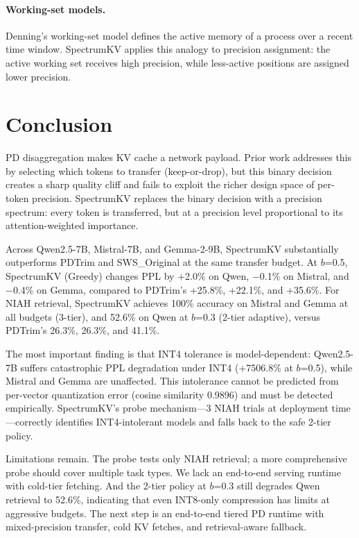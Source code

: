 \documentclass[11pt]{article}
\newcommand{\method}{SpectrumKV}
\newcommand{\fullmethod}{SpectrumKV}
\newcommand{\pct}{\%}
\theoremstyle{definition}
\theoremstyle{plain}
\begin{document}
\paragraph{Working-set models.}
Denning's working-set model \citep{denning1968working} defines the active memory of a process over a recent time window.  \method{} applies this analogy to precision assignment: the active working set receives high precision, while less-active positions are assigned lower precision.

\section{Conclusion}
\label{sec:conclusion}

PD disaggregation makes KV cache a network payload.  Prior work addresses this by selecting which tokens to transfer (keep-or-drop), but this binary decision creates a sharp quality cliff and fails to exploit the richer design space of per-token precision.  \fullmethod{} replaces the binary decision with a precision spectrum: every token is transferred, but at a precision level proportional to its attention-weighted importance.

Across Qwen2.5-7B, Mistral-7B, and Gemma-2-9B, \method{} substantially outperforms PDTrim and SWS\_Original at the same transfer budget.  At $b$=0.5, \method{} (Greedy) changes PPL by +2.0\pct{} on Qwen, $-$0.1\pct{} on Mistral, and $-$0.4\pct{} on Gemma, compared to PDTrim's +25.8\pct{}, +22.1\pct{}, and +35.6\pct{}.  For NIAH retrieval, \method{} achieves 100\pct{} accuracy on Mistral and Gemma at all budgets (3-tier), and 52.6\pct{} on Qwen at $b$=0.3 (2-tier adaptive), versus PDTrim's 26.3\pct{}, 26.3\pct{}, and 41.1\pct{}.

The most important finding is that INT4 tolerance is model-dependent: Qwen2.5-7B suffers catastrophic PPL degradation under INT4 (+7506.8\pct{} at $b$=0.5), while Mistral and Gemma are unaffected.  This intolerance cannot be predicted from per-vector quantization error (cosine similarity 0.9896) and must be detected empirically.  \method{}'s probe mechanism---3 NIAH trials at deployment time---correctly identifies INT4-intolerant models and falls back to the safe 2-tier policy.

Limitations remain.  The probe tests only NIAH retrieval; a more comprehensive probe should cover multiple task types.  We lack an end-to-end serving runtime with cold-tier fetching.  And the 2-tier policy at $b$=0.3 still degrades Qwen retrieval to 52.6\pct{}, indicating that even INT8-only compression has limits at aggressive budgets.  The next step is an end-to-end tiered PD runtime with mixed-precision transfer, cold KV fetches, and retrieval-aware fallback.
\end{document}
